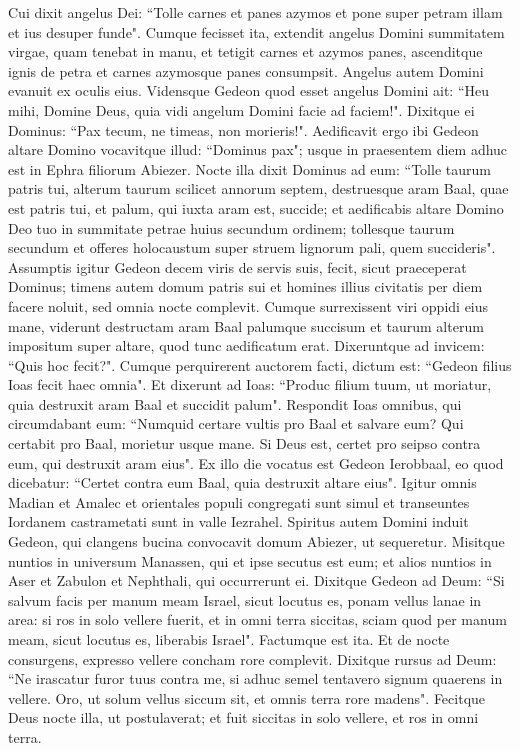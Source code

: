 \begin{biblechapter}
\verse Cui dixit angelus Dei: “Tolle carnes et panes azymos et pone super petram illam et ius desuper funde". Cumque fecisset ita, 
\verse extendit angelus Domini summitatem virgae, quam tenebat in manu, et tetigit carnes et azymos panes, ascenditque ignis de petra et carnes azymosque panes consumpsit. Angelus autem Domini evanuit ex oculis eius. 
\verse Vidensque Gedeon quod esset angelus Domini ait: “Heu mihi, Domine Deus, quia vidi angelum Domini facie ad faciem!". 
\verse Dixitque ei Dominus: “Pax tecum, ne timeas, non morieris!". 
\verse Aedificavit ergo ibi Gedeon altare Domino vocavitque illud: “Dominus pax"; usque in praesentem diem adhuc est in Ephra filiorum Abiezer. 
\verse Nocte illa dixit Dominus ad eum: “Tolle taurum patris tui, alterum taurum scilicet annorum septem, destruesque aram Baal, quae est patris tui, et palum, qui iuxta aram est, succide; 
\verse et aedificabis altare Domino Deo tuo in summitate petrae huius secundum ordinem; tollesque taurum secundum et offeres holocaustum super struem lignorum pali, quem succideris". 
\verse Assumptis igitur Gedeon decem viris de servis suis, fecit, sicut praeceperat Dominus; timens autem domum patris sui et homines illius civitatis per diem facere noluit, sed omnia nocte complevit. 
\verse Cumque surrexissent viri oppidi eius mane, viderunt destructam aram Baal palumque succisum et taurum alterum impositum super altare, quod tunc aedificatum erat. 
\verse Dixeruntque ad invicem: “Quis hoc fecit?". Cumque perquirerent auctorem facti, dictum est: “Gedeon filius Ioas fecit haec omnia". 
\verse Et dixerunt ad Ioas: “Produc filium tuum, ut moriatur, quia destruxit aram Baal et succidit palum". 
\verse Respondit Ioas omnibus, qui circumdabant eum: “Numquid certare vultis pro Baal et salvare eum? Qui certabit pro Baal, morietur usque mane. Si Deus est, certet pro seipso contra eum, qui destruxit aram eius". 
\verse Ex illo die vocatus est Gedeon Ierobbaal, eo quod dicebatur: “Certet contra eum Baal, quia destruxit altare eius". 
\verse Igitur omnis Madian et Amalec et orientales populi congregati sunt simul et transeuntes Iordanem castrametati sunt in valle Iezrahel. 
\verse Spiritus autem Domini induit Gedeon, qui clangens bucina convocavit domum Abiezer, ut sequeretur. 
\verse Misitque nuntios in universum Manassen, qui et ipse secutus est eum; et alios nuntios in Aser et Zabulon et Nephthali, qui occurrerunt ei. 
\verse Dixitque Gedeon ad Deum: “Si salvum facis per manum meam Israel, sicut locutus es, 
\verse ponam vellus lanae in area: si ros in solo vellere fuerit, et in omni terra siccitas, sciam quod per manum meam, sicut locutus es, liberabis Israel". 
\verse Factumque est ita. Et de nocte consurgens, expresso vellere concham rore complevit. 
\verse Dixitque rursus ad Deum: “Ne irascatur furor tuus contra me, si adhuc semel tentavero signum quaerens in vellere. Oro, ut solum vellus siccum sit, et omnis terra rore madens". 
\verse Fecitque Deus nocte illa, ut postulaverat; et fuit siccitas in solo vellere, et ros in omni terra. 
\end{biblechapter}

